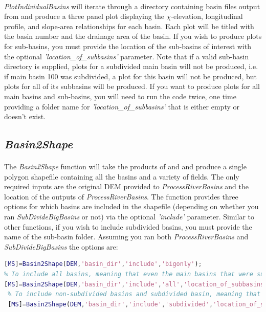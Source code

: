 \paragraph{}\textit{PlotIndividualBasins} will iterate through a directory containing basin files output from  and produce a three panel plot displaying the $\chi$-elevation, longitudinal profile, and slope-area relationships for each basin. Each plot will be titled with the basin number and the drainage area of the basin. If you wish to produce plots for sub-basins, you must provide the location of the sub-basins of interest with the optional \textit{'location\_of\_subbasins'} parameter. Note that if a valid sub-basin directory is supplied, plots for a subdivided main basin will not be produced, i.e. if main basin 100 was subdivided, a plot for this basin will not be produced, but plots for all of its subbasins will be produced. If you want to produce plots for all main basins and sub-basins, you will need to run the code twice, one time providing a folder name for \textit{'location\_of\_subbasins'}  that is either empty or doesn't exist.

\subsection{\textit{Basin2Shape}} \label{sec:B2S}
\paragraph{}The \textit{Basin2Shape} function will take the products of  and  and produce a single polygon shapefile containing all the basins and a variety of fields. The only required inputs are the original DEM provided to \textit{ProcessRiverBasins} and the location of the outputs of \textit{ProcessRiverBasins}. The function provides three options for which basins are included in the shapefile (depending on whether you ran \textit{SubDivideBigBasins} or not) via the optional \textit{'include'} parameter. Similar to other functions, if you wish to include subdivided basins, you must provide the name of the sub-basin folder. Assuming you ran both \textit{ProcessRiverBasins} and \textit{SubDivideBigBasins} the options are:

\begin{lstlisting}[language=Matlab]
% To include only the original products of ProcessRiverBasins
[MS]=Basin2Shape(DEM,'basin_dir','include','bigonly');
% To include all basins, meaning that even the main basins that were subdivided will be inlcuded
[MS]=Basin2Shape(DEM,'basin_dir','include','all','location_of_subbasins','my_sub_basins');
 % To include non-subdivided basins and subdivided basin, meaning that main basins that were subdivided will  NOT be included
 [MS]=Basin2Shape(DEM,'basin_dir','include','subdivided','location_of_subbasins','my_sub_basins');
\end{lstlisting}

